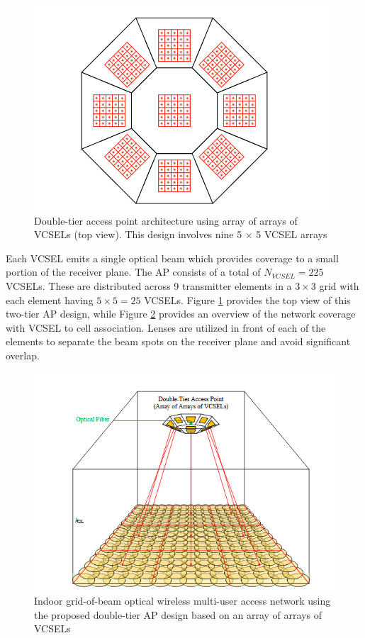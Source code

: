 \begin{figure}
    \centering
    \includegraphics[width=0.75\linewidth]{Figures/Optical-AP-top-view.png}
    \caption{Double-tier access point architecture using array of arrays of VCSELs (top view). This design involves nine 5 × 5 VCSEL arrays \cite{sarbazi_tbs_2020}}
    \label{fig:mod-ntw-opt-top-view}
\end{figure}

 Each VCSEL emits a single optical beam which provides coverage to a small portion of the receiver plane. The AP consists of a total of $N_{VCSEL}=225$ VCSELs. These are distributed across 9 transmitter elements in a $3\times3$ grid with each element having $5\times5=25$ VCSELs. Figure \ref{fig:mod-ntw-opt-top-view} provides the top view of this two-tier AP design, while Figure \ref{fig:mod-ntw-opt-coverage} provides an overview of the network coverage with VCSEL to cell association. Lenses are utilized in front of each of the elements to separate the beam spots on the receiver plane and avoid significant overlap.

\begin{figure}
    \centering
    \includegraphics[width=0.75\linewidth]{Figures/Optical-AP-coverage.png}
\caption{Indoor grid-of-beam optical wireless multi-user access network using the proposed double-tier AP design based on an array of arrays of VCSELs \cite{kazemi_novel_2024}}
    \label{fig:mod-ntw-opt-coverage}
\end{figure}

